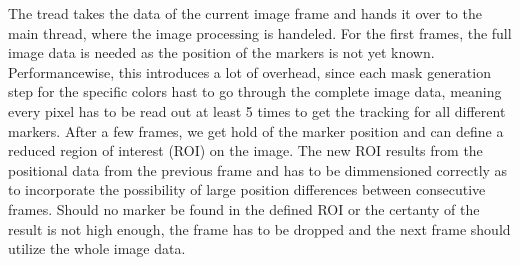 The tread takes the data of the current image frame and hands it over to the main thread, where the image processing is handeled. For the first frames, the full image data is needed as the position of the markers is not yet known. Performancewise, this introduces a lot of overhead, since each mask generation step for the specific colors hast to go through the complete image data, meaning every pixel has to be read out at least 5 times to get the tracking for all different markers. After a few frames, we get hold of the marker position and can define a reduced region of interest (ROI) on the image. The new ROI results from the positional data from the previous frame and has to be dimmensioned correctly as to incorporate the possibility of large position differences between consecutive frames. Should no marker be found in the defined ROI or the certanty of the result is not high enough, the frame has to be dropped and the next frame should utilize the whole image data.

